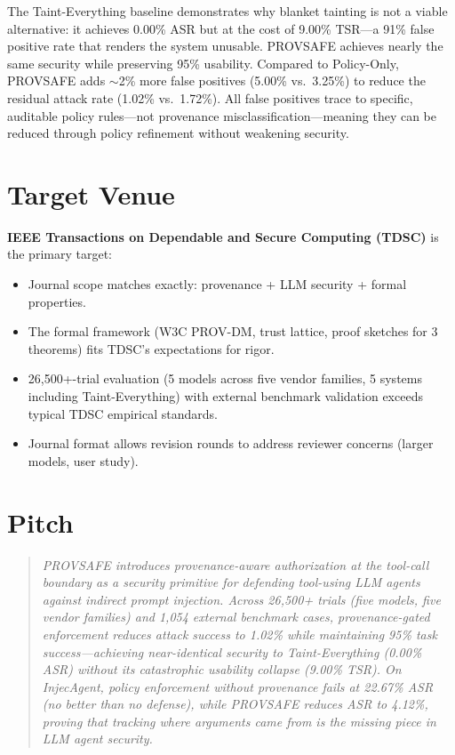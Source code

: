 \documentclass[11pt]{article}
\begin{document}
The Taint-Everything baseline demonstrates why blanket tainting is not a viable alternative: it achieves 0.00\% ASR but at the cost of 9.00\% TSR---a 91\% false positive rate that renders the system unusable. PROVSAFE achieves nearly the same security while preserving 95\% usability. Compared to Policy-Only, PROVSAFE adds $\sim$2\% more false positives (5.00\% vs.\ 3.25\%) to reduce the residual attack rate (1.02\% vs.\ 1.72\%). All false positives trace to specific, auditable policy rules---not provenance misclassification---meaning they can be reduced through policy refinement without weakening security.

\section*{Target Venue}

\textbf{IEEE Transactions on Dependable and Secure Computing (TDSC)} is the primary target:
\begin{itemize}[leftmargin=1.5em]
    \item Journal scope matches exactly: provenance + LLM security + formal properties.
    \item The formal framework (W3C PROV-DM, trust lattice, proof sketches for 3 theorems) fits TDSC's expectations for rigor.
    \item 26,500+-trial evaluation (5 models across five vendor families, 5 systems including Taint-Everything) with external benchmark validation exceeds typical TDSC empirical standards.
    \item Journal format allows revision rounds to address reviewer concerns (larger models, user study).
\end{itemize}

\section*{Pitch}

\begin{quote}
\textit{PROVSAFE introduces provenance-aware authorization at the tool-call boundary as a security primitive for defending tool-using LLM agents against indirect prompt injection. Across 26,500+ trials (five models, five vendor families) and 1,054 external benchmark cases, provenance-gated enforcement reduces attack success to 1.02\% while maintaining 95\% task success---achieving near-identical security to Taint-Everything (0.00\% ASR) without its catastrophic usability collapse (9.00\% TSR). On InjecAgent, policy enforcement without provenance fails at 22.67\% ASR (no better than no defense), while PROVSAFE reduces ASR to 4.12\%, proving that tracking where arguments came from is the missing piece in LLM agent security.}
\end{quote}
\end{document}
